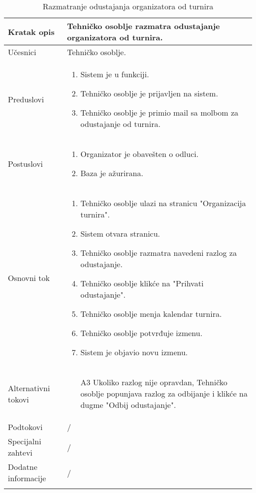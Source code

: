 \documentclass{article}
\begin{document}
 \begin{longtable}{| p{} | p{} |} 
            \hline
                Kratak opis & Tehničko osoblje razmatra odustajanje organizatora od turnira. \\ 
            \hline    
                Učesnici & Tehničko osoblje.\\
            \hline
               Preduslovi & \begin{enumerate}
                   \item Sistem je u funkciji.
                   \item Tehničko osoblje je prijavljen na sistem. 
                   \item Tehničko osoblje je primio mail sa molbom za odustajanje od turnira.
                \end{enumerate}\\
            \hline  
                Postuslovi & \begin{enumerate}
                   \item Organizator je obavešten o odluci.
                   \item Baza je ažurirana. 
                \end{enumerate}\\
            \hline
                Osnovni tok & \begin{enumerate}
                    \item Tehničko osoblje ulazi na stranicu "Organizacija turnira".
                    \item Sistem otvara stranicu.
                    \item Tehničko osoblje razmatra navedeni razlog za odustajanje.
                    \item Tehničko osoblje klikće na "Prihvati odustajanje".
                    \item Tehničko osoblje menja kalendar turnira.
                    \item Tehničko osoblje potvrđuje izmenu.
                    \item Sistem je objavio novu izmenu.
                \end{enumerate}\\
            \hline
                Alternativni tokovi & 
                \begin{itemize}
                    \item[A3] Ukoliko razlog nije opravdan, Tehničko osoblje popunjava razlog za odbijanje i klikće na dugme "Odbij odustajanje".
                \end{itemize}\\
            \hline
                Podtokovi & /\\
            \hline
                Specijalni zahtevi & /\\
            \hline
                Dodatne informacije & /\\
            \hline
            \caption{Razmatranje odustajanja organizatora od turnira}
        \end{longtable}
\end{document}
